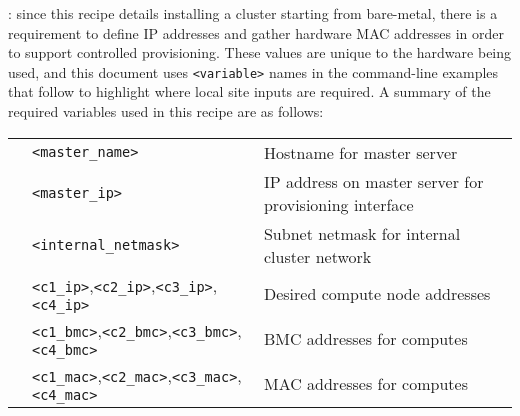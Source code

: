: since this recipe details installing a cluster
starting from bare-metal, there is a requirement to define IP addresses and gather
hardware MAC addresses in order to support controlled provisioning. These values
are unique to the hardware being used, and this document uses \texttt{<variable>}
names in the command-line examples that follow to highlight where local site
inputs are required. A summary of the required variables used in this recipe
are as follows: \\

\vspace*{0.2cm}
\begin{tabular}{@{}>{\textbullet}cll@{}}
& \texttt{<master\_name>}  & Hostname for master server \\
& \texttt{<master\_ip>} & IP address on master server for provisioning interface \\
& \texttt{<internal\_netmask>} & Subnet netmask for internal cluster network \\
& \texttt{<c1\_ip>},\texttt{<c2\_ip>},\texttt{<c3\_ip>},\texttt{<c4\_ip>}
& Desired compute node addresses \\
& \texttt{<c1\_bmc>},\texttt{<c2\_bmc>},\texttt{<c3\_bmc>},\texttt{<c4\_bmc>}
& BMC addresses for computes \\
& \texttt{<c1\_mac>},\texttt{<c2\_mac>},\texttt{<c3\_mac>},\texttt{<c4\_mac>}
& MAC addresses for computes \\
\end{tabular}

